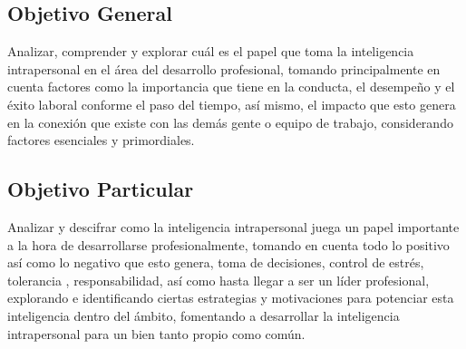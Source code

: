 \subsection{Objetivo General}
Analizar, comprender  y explorar cuál es el papel que toma la inteligencia
intrapersonal en el área del desarrollo profesional, tomando principalmente en
cuenta factores como la importancia que tiene en la conducta, el desempeño y el
éxito laboral conforme el paso del tiempo, así mismo, el impacto que esto genera
en la conexión que existe con las demás gente o equipo de trabajo, considerando
factores esenciales y primordiales.
\subsection{Objetivo Particular}
Analizar y descifrar como la inteligencia intrapersonal juega un papel
importante a la hora de desarrollarse profesionalmente, tomando en cuenta todo
lo positivo así como lo negativo que esto genera, toma de decisiones, control de
estrés, tolerancia , responsabilidad, así como hasta llegar a ser un líder
profesional, explorando e identificando ciertas estrategias y motivaciones para
potenciar esta inteligencia dentro del ámbito, fomentando a desarrollar la
inteligencia intrapersonal para un bien tanto propio como común.
